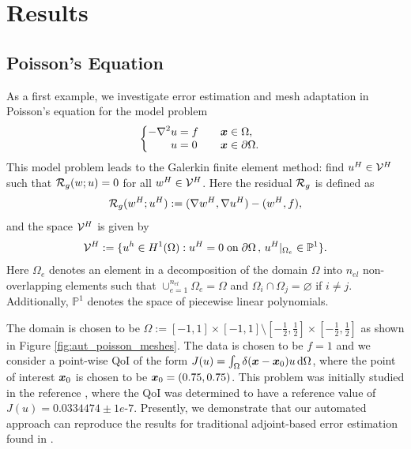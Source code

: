 \section{Results}

\subsection{Poisson's Equation}

As a first example, we investigate error estimation and mesh adaptation
in Poisson's equation for the model problem
%
\begin{gather}
\begin{cases}
\begin{aligned}
- \nabla^2 u &= f \quad && \boldsymbol{x} \in \Omega, \\
u &= 0 \quad && \boldsymbol{x} \in \partial \Omega.
\end{aligned}
\end{cases}
\end{gather}
%
This model problem leads to the Galerkin finite element method: find
$u^H \in \mathcal{V}^H$ such that $\mathcal{R}_g(w; u) = 0$ for all $w^H \in \mathcal{V}^H$.
Here the residual $\mathcal{R}_g$ is defined as
%
\begin{gather}
\mathcal{R}_g(w^H; u^H) := (\nabla w^H, \nabla u^H) - (w^H, f),
\end{gather}
%
and the space $\mathcal{V}^H$ is given by
%
\begin{gather}
\mathcal{V}^H := \{ u^h \in H^1(\Omega) :
u^H = 0 \; \text{on} \; \partial \Omega \, , \,
u^H |_{\Omega_e} \in \mathbb{P}^1 \}.
\label{eq:aut_poisson_space}
\end{gather}
%
Here $\Omega_e$ denotes an element in a decomposition of the
domain $\Omega$ into $n_{el}$ non-overlapping elements such that
$\cup_{e=1}^{n_{el}} \Omega_e = \Omega$ and
$\Omega_i \cap \Omega_j = \varnothing$ if $i \neq j$.
Additionally,  $\mathbb{P}^1$ denotes the space of piecewise linear
polynomials.

The domain is chosen to be
$\Omega := [-1,1] \times [-1,1] \setminus
[-\frac12, \frac12] \times [-\frac12, \frac12]$ as shown in
Figure \ref{fig:aut_poisson_meshes}. The data is chosen to be
$f=1$ and we consider a point-wise
QoI of the form
$J(u) = \int_{\Omega} \delta(\boldsymbol{x} - \boldsymbol{x}_0) u \, \text{d} \Omega$,
where the point of interest $\boldsymbol{x}_0$ is chosen to be
$\boldsymbol{x}_0 = (0.75, 0.75)$. This problem was initially studied in
the reference \cite{dealiistep14}, where the QoI was determined
to have a reference value of $J(u) = 0.0334474 \pm 1e\mbox{-}7$.
Presently, we demonstrate that our automated approach can
reproduce the results for traditional adjoint-based error estimation
found in \cite{dealiistep14}.

